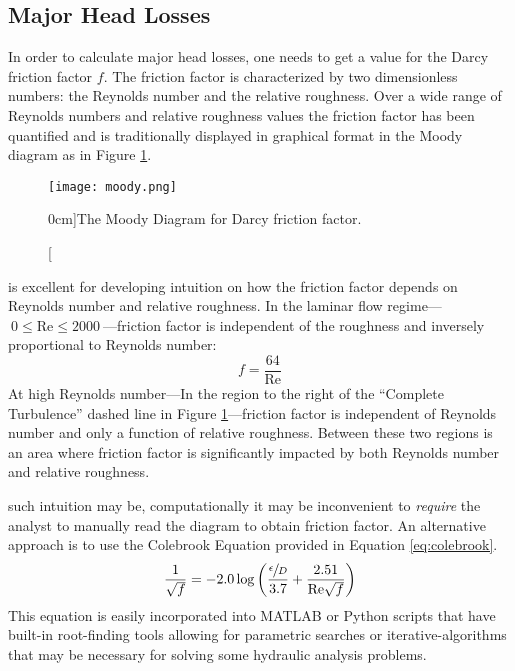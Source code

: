 \subsection{Major Head Losses}
In order to calculate major head losses, one needs to get a value for the Darcy friction factor $f$.  The friction factor is characterized by two dimensionless numbers: the Reynolds number and the relative roughness.  Over a wide range of Reynolds numbers and relative roughness values the friction factor has been quantified and is traditionally displayed in graphical format in the Moody diagram as in Figure \ref{fig:moody}.

\begin{figure}
\texttt{[image: moody.png]}
\caption[][0cm]{The Moody Diagram for Darcy friction factor.}
\label{fig:moody}
\end{figure}

 is excellent for developing intuition on how the friction factor depends on Reynolds number and relative roughness.  In the laminar flow regime---$\ 0 \le \text{Re} \le 2000\ $---friction factor is independent of the roughness and inversely proportional to Reynolds number:
$$f = \frac{64}{\text{Re}}$$
At high Reynolds number---In the region to the right of the ``Complete Turbulence'' dashed line in Figure \ref{fig:moody}---friction factor is independent of Reynolds number and only a function of relative roughness.  Between these two regions is an area where friction factor is significantly impacted by both Reynolds number and relative roughness.

 such intuition may be, computationally it may be inconvenient to \emph{require} the analyst to manually read the diagram to obtain friction factor.  An alternative approach is to use the Colebrook Equation provided in Equation \ref{eq:colebrook}.
\begin{equation}
\frac{1}{\sqrt{f}} = -2.0\log{\left(\frac{\sfrac{\epsilon}{D}}{3.7} + \frac{2.51}{\text{Re}\sqrt{f}}\right)}
\label{eq:colebrook}
\end{equation}
This equation is easily incorporated into MATLAB or Python scripts that have built-in root-finding tools allowing for parametric searches or iterative-algorithms that may be necessary for solving some hydraulic analysis problems.

